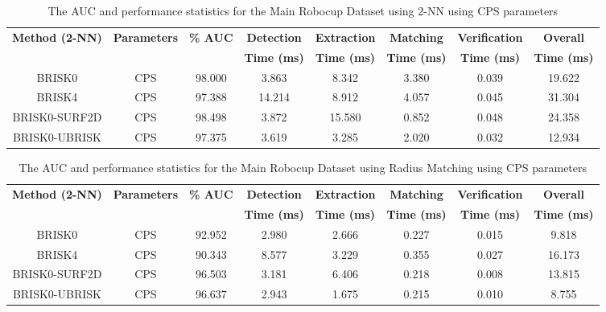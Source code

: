 \documentclass[11pt]{report}
\begin{document}
\begin{table}


\caption{The AUC and performance statistics for the Main Robocup Dataset using
2-NN using CPS parameters}


\begin{tabular}{|c|c|c|c|c|c|c|c|}
\hline 
\textbf{Method (2-NN)} & \textbf{Parameters} & \textbf{\% AUC} & \textbf{Detection} & \textbf{Extraction} & \textbf{Matching} & \textbf{Verification} & \textbf{Overall}\tabularnewline
 &  &  & \textbf{Time (ms)} & \textbf{Time (ms)} & \textbf{Time (ms)} & \textbf{Time (ms)} & \textbf{Time (ms)}\tabularnewline
\hline 
\hline 
BRISK0 & CPS & 98.000 & 3.863 & 8.342 & 3.380 & 0.039 & 19.622\tabularnewline
\hline 
BRISK4 & CPS & 97.388 & 14.214 & 8.912 & 4.057 & 0.045 & 31.304\tabularnewline
\hline 
BRISK0-SURF2D & CPS & 98.498 & 3.872 & 15.580 & 0.852 & 0.048 & 24.358\tabularnewline
\hline 
BRISK0-UBRISK & CPS & 97.375 & 3.619 & 3.285 & 2.020 & 0.032 & 12.934\tabularnewline
\hline 
\end{tabular}
\label{app:mrd_knn}
\end{table}



\begin{table}
\caption{The AUC and performance statistics for the Main Robocup Dataset using
Radius Matching using CPS parameters}


\begin{tabular}{|c|c|c|c|c|c|c|c|}
\hline 
\textbf{Method (2-NN)} & \textbf{Parameters} & \textbf{\% AUC} & \textbf{Detection} & \textbf{Extraction} & \textbf{Matching} & \textbf{Verification} & \textbf{Overall}\tabularnewline
 &  &  & \textbf{Time (ms)} & \textbf{Time (ms)} & \textbf{Time (ms)} & \textbf{Time (ms)} & \textbf{Time (ms)}\tabularnewline
\hline 
\hline 
BRISK0 & CPS & 92.952 & 2.980 & 2.666 & 0.227 & 0.015 & 9.818\tabularnewline
\hline 
BRISK4 & CPS & 90.343 & 8.577 & 3.229 & 0.355 & 0.027 & 16.173\tabularnewline
\hline 
BRISK0-SURF2D & CPS & 96.503 & 3.181 & 6.406 & 0.218 & 0.008 & 13.815\tabularnewline
\hline 
BRISK0-UBRISK & CPS & 96.637 & 2.943 & 1.675 & 0.215 & 0.010 & 8.755\tabularnewline
\hline 
\end{tabular}
\label{app:mrd_hamming}
\end{table}
\end{document}
